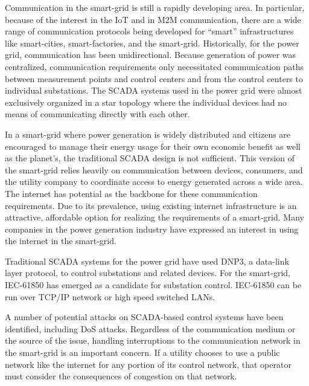 Communication in the smart-grid is still a rapidly developing area.
In particular, because of the interest in the \ac{IoT} and in \ac{M2M} communication, there are a wide range of communication protocols being developed for ``smart'' infrastructures like smart-cities, smart-factories, and the smart-grid.
Historically, for the power grid, communication has been unidirectional.
Because generation of power was centralized, communication requirements only necessitated communication paths between measurement points and control centers and from the control centers to individual substations\cite{smartgrid-comm1}.
The \ac{SCADA} systems used in the power grid were almost exclusively organized in a star topology where the individual devices had no means of communicating directly with each other.

In a smart-grid where power generation is widely distributed and citizens are encouraged to manage their energy usage for their own economic benefit as well as the planet's, the traditional \ac{SCADA} design is not sufficient\cite{smartgrid-comm1}\cite{smartgrid-comm-lastmile}\cite{smartgrid-comm-m2m}.
This version of the smart-grid relies heavily on communication between devices, consumers, and the utility company to coordinate access to energy generated across a wide area.
The internet has potential as the backbone for these communication requirements.
Due to its prevalence, using existing internet infrastructure is an attractive, affordable option for realizing the requirements of a smart-grid\cite{smartgrid-comm-germany}\cite{smartgrid-comm-lastmile}.
Many companies in the power generation industry have expressed an interest in using the internet in the smart-grid\cite{smartgrid-comm-doe}.

Traditional \ac{SCADA} systems for the power grid have used \ac{DNP3}, a data-link layer protocol, to control substations and related devices\cite{dnp3}.
For the smart-grid, IEC-61850 has emerged as a candidate for substation control\cite{iec61850-1}\cite{iec61850-2}\cite{iec61850-3}.
IEC-61850 can be run over TCP/IP network or high speed switched LANs\cite{iec61850-3}.

A number of potential attacks on \ac{SCADA}-based control systems have been identified\cite{smartgrid-security}\cite{smartgrid-attacks}, including \ac{DoS} attacks\cite{scada-attack-dos}\cite{dnp3-attack}.
Regardless of the communication medium or the source of the issue, handling interruptions to the communication network in the smart-grid is an important concern.
If a utility chooses to use a public network like the internet for any portion of its control network, that operator must consider the consequences of congestion on that network\cite{intelligent-control}\cite{plc-communication}\cite{wireless-congestion}.

